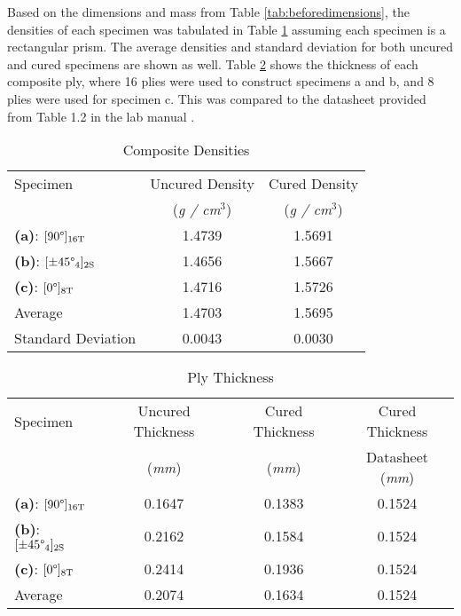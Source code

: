
Based on the dimensions and mass from Table \ref{tab:beforedimensions}, the densities of each specimen was tabulated in Table \ref{tab:beforedensity} assuming each specimen is a rectangular prism. The average densities and standard deviation for both uncured and cured specimens are shown as well. Table \ref{tab:ply_thickness} shows the thickness of each composite ply, where 16 plies were used to construct specimens a and b, and 8 plies were used for specimen c. This was compared to the datasheet provided from Table 1.2 in the lab manual \cite{labmanual}.

\begin{table}[!h]
    \centering
    \caption{Composite Densities}
    \begin{tabular}{|l||c|c|}\toprule
        Specimen & Uncured Density & Cured Density \\ 
        & (\textit{g / cm$^{3}$}) & (\textit{g / cm$^{3}$}) \\ \midrule
        \textbf{(a)}: $[90\degree]_{16\text{T}}$  & 1.4739 & 1.5691 \\\hline
        \textbf{(b)}: $[\pm45\degree_4]_{2\text{S}}$ & 1.4656  & 1.5667 \\\hline
        \textbf{(c)}: $[0\degree]_{8\text{T}}$ & 1.4716 & 1.5726 \\\bottomrule
        Average & 1.4703 & 1.5695 \\\hline
        Standard Deviation & 0.0043 & 0.0030 \\\bottomrule
    \end{tabular}
    \label{tab:beforedensity}
\end{table}

\begin{table}[!h]
    \centering
    \caption{Ply Thickness}
    \begin{tabular}{|l||c|c|c|}\toprule
        Specimen & Uncured Thickness & Cured Thickness & Cured Thickness \\
        & (\textit{mm}) & (\textit{mm}) & Datasheet (\textit{mm}) \\ \midrule
        \textbf{(a)}: $[90\degree]_{16\text{T}}$  & 0.1647 & 0.1383 & 0.1524 \\\hline
        \textbf{(b)}: $[\pm45\degree_4]_{2\text{S}}$ & 0.2162 & 0.1584 & 0.1524 \\\hline
        \textbf{(c)}: $[0\degree]_{8\text{T}}$ & 0.2414 & 0.1936 & 0.1524 \\\bottomrule
        Average & 0.2074 & 0.1634 & 0.1524 \\\bottomrule
    \end{tabular}
    \label{tab:ply_thickness}
\end{table}

